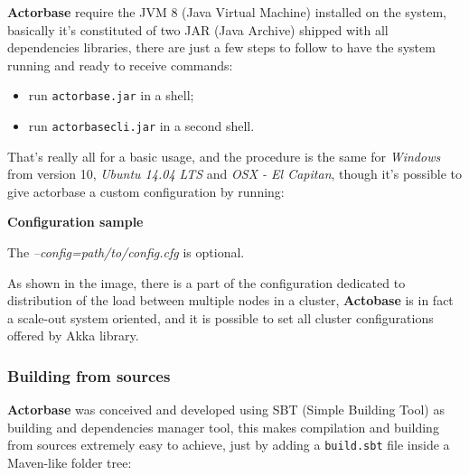 \documentclass{scalatekids-article}
\begin{document}
\textbf{Actorbase} require the JVM 8 (Java Virtual Machine) installed on the
system, basically it's constituted of two JAR (Java Archive) shipped with all
dependencies libraries, there are just a few steps to follow to have the system
running and ready to receive commands:
\begin{itemize}
\item run \verb=actorbase.jar= in a shell;
\item run \verb=actorbasecli.jar= in a second shell.
\end{itemize}
That's really all for a basic usage, and the procedure is the same for
\textit{Windows} from version 10, \textit{Ubuntu 14.04 LTS} and \textit{OSX - El
Capitan}, though it's possible to give actorbase a custom configuration by
running:


\textbf{Configuration sample}


The \textit{--config=path/to/config.cfg} is optional.

As shown in the image, there is a part of the configuration dedicated to distribution of the load between
multiple nodes in a cluster, \textbf{Actobase} is in fact a scale-out system oriented, and it is possible
to set all cluster configurations offered by Akka library.

\subsubsection{Building from sources}

\textbf{Actorbase} was conceived and developed using SBT (Simple Building Tool) as building and dependencies
manager tool, this makes compilation and building from sources extremely easy to achieve, just by adding a
\verb=build.sbt= file inside a Maven-like folder tree:
\end{document}
